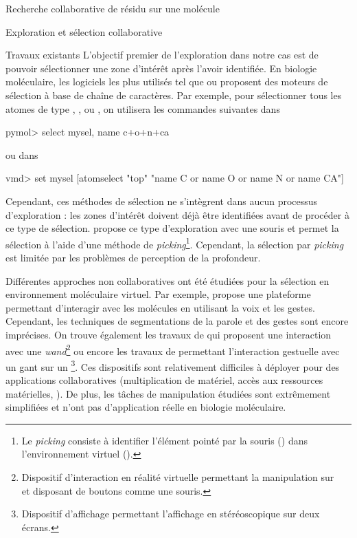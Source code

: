 \documentclass[myfrancais,ngerman,english,frenchb]{mythesis}
\begin{document}
\begin{mychapter}{Recherche collaborative de résidu sur une molécule}
\begin{mysection}{Exploration et sélection collaborative}
\begin{mysubsection}{Travaux existants}
				L'objectif premier de l'exploration dans notre cas est de pouvoir sélectionner une zone d'intérêt après l'avoir identifiée.
				En biologie moléculaire, les logiciels les plus utilisés tel que \myPyMOL ou  proposent des moteurs de sélection à base de chaîne de caractères.
				Par exemple, pour sélectionner tous les atomes de type , ,  ou , on utilisera les commandes suivantes dans \myPyMOL
				\begin{mySource*}[language={}]
pymol> select mysel, name c+o+n+ca
				\end{mySource*}
				ou dans 
				\begin{mySource*}[language={}]
vmd> set mysel [atomselect "top" "name C or name O or name N or name CA"]
				\end{mySource*}

				Cependant, ces méthodes de sélection ne s'intègrent dans aucun processus d'exploration : les zones d'intérêt doivent déjà être identifiées avant de procéder à ce type de sélection.
				 propose ce type d'exploration avec une souris et permet la sélection à l'aide d'une méthode de \textit{picking}\footnote{Le \textit{picking} consiste à identifier l'élément pointé par la souris (\myTwoD) dans l'environnement virtuel (\myThreeD).}.
				Cependant, la sélection par \textit{picking} est limitée par les problèmes de perception de la profondeur.

				Différentes approches non collaboratives ont été étudiées pour la sélection en environnement moléculaire virtuel.
				Par exemple,  propose une plateforme permettant d'interagir avec les molécules en utilisant la voix et les gestes.
				Cependant, les techniques de segmentations de la parole et des gestes sont encore imprécises.
				On trouve également les travaux de  qui proposent une interaction avec une \textit{wand}\footnote{Dispositif d'interaction en réalité virtuelle permettant la manipulation sur ~ et disposant de boutons comme une souris.} ou encore les travaux de  permettant l'interaction gestuelle avec un gant sur un \myWorkbench\footnote{Dispositif d'affichage permettant l'affichage en \myThreeD stéréoscopique sur deux écrans.}.
				Ces dispositifs sont relativement difficiles à déployer pour des applications collaboratives (multiplication de matériel, accès aux ressources matérielles, \myetc).
				De plus, les tâches de manipulation étudiées sont extrêmement simplifiées et n'ont pas d'application réelle en biologie moléculaire.


\end{mysubsection}
\end{mysection}
\end{mychapter}
\end{document}
